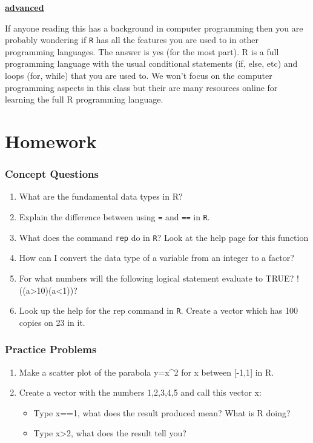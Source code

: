 \documentclass[
]{book}
\providecommand{\tightlist}{%
  \setlength{\itemsep}{0pt}\setlength{\parskip}{0pt}}
\newenvironment{rmdblock}[1]
  {\begin{shaded*}
  \centerline{\underline{\textbf{#1}}}

  }
  {
  \end{shaded*}
  }
\newenvironment{advanced}
  {\begin{rmdblock}{advanced}}
  {\end{rmdblock}}
\theoremstyle{definition}
\theoremstyle{definition}
\theoremstyle{definition}
\theoremstyle{definition}
\theoremstyle{remark}
\begin{document}
\begin{advanced}
If anyone reading this has a background in computer programming then you are probably wondering if \texttt{R} has all the features you are used to in other programming languages. The answer is yes (for the most part). R is a full programming language with the usual conditional statements (if, else, etc) and loops (for, while) that you are used to. We won't focus on the computer programming aspects in this class but their are many resources online for learning the full R programming language.
\end{advanced}

\hypertarget{homework}{%
\section{Homework}\label{homework}}

\hypertarget{concept-questions}{%
\subsubsection{Concept Questions}\label{concept-questions}}

\begin{enumerate}
\def\labelenumi{\arabic{enumi}.}
\tightlist
\item
  What are the fundamental data types in R?
\item
  Explain the difference between using \texttt{=} and \texttt{==} in \texttt{R}.
\item
  What does the command \texttt{rep} do in \texttt{R}? Look at the help page for this function
\item
  How can I convert the data type of a variable from an integer to a factor?
\item
  For what numbers will the following logical statement evaluate to TRUE? !((a\textgreater10)\textbar\textbar(a\textless1))?
\item
  Look up the help for the rep command in \texttt{R}. Create a vector which has 100 copies on 23 in it.
\end{enumerate}

\hypertarget{practice-problems}{%
\subsubsection{Practice Problems}\label{practice-problems}}

\begin{enumerate}
\def\labelenumi{\arabic{enumi}.}
\item
  Make a scatter plot of the parabola y=x\^{}2 for x between {[}-1,1{]} in R.
\item
  Create a vector with the numbers 1,2,3,4,5 and call this vector x:

  \begin{itemize}
  \tightlist
  \item
    Type x==1, what does the result produced mean? What is R doing?
  \item
    Type x\textgreater2, what does the result tell you?
  \end{itemize}
\end{enumerate}
\end{document}
